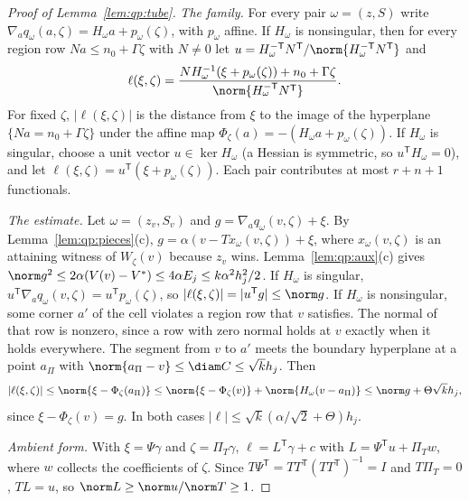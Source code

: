 \begin{proof}[Proof of Lemma~\ref{lem:qp:tube}]
\emph{The family.} For every pair $\omega=(z,S)$ write
$\nabla_aq_\omega(a,\zeta)=H_\omega a+p_\omega(\zeta)$, with $p_\omega$ affine.
If $H_\omega$ is nonsingular, then for every region row $N a\le n_0+\Gamma\zeta$
with $N\ne0$ let $u=H_\omega^{-\mathsf T}N^{\mathsf T}/\norm{H_\omega^{-\mathsf T}N^{\mathsf T}}$ and
\[
 \ell(\xi,\zeta)=\frac{N H_\omega^{-1}(\xi+p_\omega(\zeta))+n_0+\Gamma\zeta}{\norm{H_\omega^{-\mathsf T}N^{\mathsf T}}} .
\]
For fixed $\zeta$, $|\ell(\xi,\zeta)|$ is the distance from $\xi$ to the image
of the hyperplane $\{Na=n_0+\Gamma\zeta\}$ under the affine map
$\Phi_\zeta(a)=-(H_\omega a+p_\omega(\zeta))$. If $H_\omega$ is singular, choose a
unit vector $u\in\ker H_\omega$ (a Hessian is symmetric, so $u^{\mathsf T}H_\omega=0$), and let
$\ell(\xi,\zeta)=u^{\mathsf T}(\xi+p_\omega(\zeta))$. Each pair contributes at most
$r+n+1$ functionals.

\emph{The estimate.} Let $\omega=(z_v,S_v)$ and $g=\nabla_aq_\omega(v,\zeta)+\xi$.
By Lemma~\ref{lem:qp:pieces}(c), $g=\alpha(v-Tx_\omega(v,\zeta))+\xi$, where
$x_\omega(v,\zeta)$ is an attaining witness of $W_\zeta(v)$ because $z_v$ wins.
Lemma~\ref{lem:qp:aux}(c) gives
$\norm g^2\le2\alpha(V(v)-V^*)\le4\alpha E_j\le k\alpha^2h_j^2/2$. If $H_\omega$
is singular, $u^{\mathsf T}\nabla_aq_\omega(v,\zeta)=u^{\mathsf T} p_\omega(\zeta)$, so
$|\ell(\xi,\zeta)|=|u^{\mathsf T} g|\le\norm g$. If $H_\omega$ is nonsingular, some
corner $a'$ of the cell violates a region row that $v$ satisfies. The normal of
that row is nonzero, since a row with zero normal holds at $v$ exactly when it
holds everywhere. The segment from $v$ to $a'$ meets the boundary hyperplane
at a point $a_\Pi$ with $\norm{a_\Pi-v}\le\diam C\le\sqrt kh_j$. Then
\[
 |\ell(\xi,\zeta)|\le\norm{\xi-\Phi_\zeta(a_\Pi)}
 \le\norm{\xi-\Phi_\zeta(v)}+\norm{H_\omega(v-a_\Pi)}
 \le\norm g+\Theta\sqrt kh_j ,
\]
since $\xi-\Phi_\zeta(v)=g$. In both cases
$|\ell|\le\sqrt k(\alpha/\sqrt2+\Theta)h_j$.

\emph{Ambient form.} With $\xi=\Psi\gamma$ and $\zeta=\Pi_T\gamma$,
$\ell=L^{\mathsf T}\gamma+c$ with $L=\Psi^{\mathsf T} u+\Pi_Tw$, where $w$ collects the
coefficients of $\zeta$. Since $T\Psi^{\mathsf T}=TT^{\mathsf T}(TT^{\mathsf T})^{-1}=I$ and
$T\Pi_T=0$, $TL=u$, so $\norm L\ge\norm u/\norm T\ge1$.
\end{proof}

